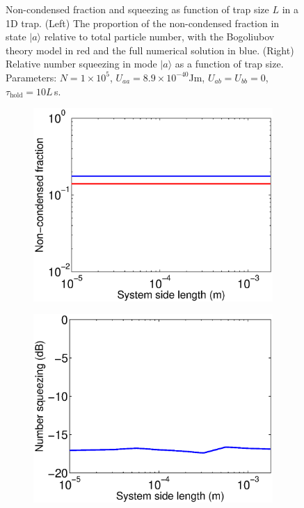 \documentclass{iopart}
\begin{document}
\begin{figure}
\begin{subfigure}{.48\textwidth}
  \end{subfigure}
\caption{Non-condensed fraction and squeezing as function of trap size $L$ in a 1D trap. (Left) The proportion of the non-condensed fraction in state $|a\rangle$ relative to total particle number, with the Bogoliubov theory model in red and the full numerical solution in blue. (Right) Relative number squeezing in mode $|a\rangle$ as a function of trap size. Parameters: $N=1\times 10^5$, $U_{aa} = 8.9\times 10^{-40}$Jm, $U_{ab}=U_{bb}=0$, $\tau_{\mathrm{hold}} = 10L$\,s.}
  \label{fig1D_squeezing_and_bog_scaling}
\end{figure}


\begin{figure}
  \centering
  \begin{subfigure}{.48\textwidth}
    \centering
    \includegraphics[width=\textwidth]{figures/2D_Bog_mode_occupation_scaling.eps}
  \end{subfigure}
  \begin{subfigure}{.48\textwidth}
    \centering
    \includegraphics[width=\textwidth]{figures/2D_squeezing_scaling.eps}

\end{subfigure}
\end{figure}
\end{document}
